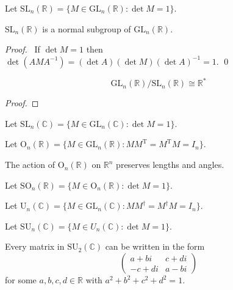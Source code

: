 \begin{df}
Let $\mathrm{SL}_n(\mathbb{R}) = \{ M \in \mathrm{GL}_n(\mathbb{R}) : \det M = 1 \}$.
\end{df}

\begin{prop}
$\mathrm{SL}_n(\mathbb{R})$ is a normal subgroup of $\mathrm{GL}_n(\mathbb{R})$.
\end{prop}

\begin{proof}
\pf\ If $\det M = 1$ then $\det(AMA^{-1}) = (\det A) (\det M) (\det A)^{-1} = 1$. \qed
\end{proof}

\begin{prop}
\[ \mathrm{GL}_n(\mathbb{R}) / \mathrm{SL}_n(\mathbb{R}) \cong \mathbb{R}^* \]
\end{prop}

\begin{proof}
\end{proof}

\begin{df}
Let $\mathrm{SL}_n(\mathbb{C}) = \{ M \in \mathrm{GL}_n(\mathbb{C}) : \det M = 1 \}$.
\end{df}

\begin{df}
Let $\mathrm{O}_n(\mathbb{R}) = \{ M \in \mathrm{GL}_n(\mathbb{R}) : M M^\mathrm{T} = M^\mathrm{T} M = I_n \}$.
\end{df}

\begin{prop}
The action of $\mathrm{O}_n(\mathbb{R})$ on $\mathbb{R}^n$ preserves lengths and angles.
\end{prop}


\begin{df}
Let $\mathrm{SO}_n(\mathbb{R}) = \{ M \in \mathrm{O}_n(\mathbb{R}) : \det M = 1 \}$.
\end{df}

\begin{df}
Let $\mathrm{U}_n(\mathbb{C}) = \{ M \in \mathrm{GL}_n(\mathbb{C}) : M M^\dagger = M^\dagger M = I_n \}$.
\end{df}

\begin{df}
Let $\mathrm{SU}_n(\mathbb{C}) = \{ M \in U_n(\mathbb{C}) : \det M = 1 \}$.
\end{df}

\begin{prop}
Every matrix in $\mathrm{SU}_2(\mathbb{C})$ can be written in the form
\[ \left( \begin{array}{cc}
a + b i & c + d i \\
-c + di & a - bi
\end{array} \right) \]
for some $a,b,c,d \in \mathbb{R}$ with $a^2 + b^2 + c^2 + d^2 = 1$.
\end{prop}

